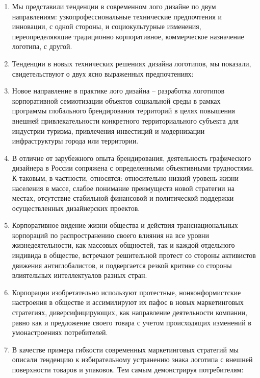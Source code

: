 \begin{enumerate}
\item Мы представили тенденции в современном лого дизайне по двум направлениям: узкопрофессиональные
  технические предпочтения и инновации, с одной стороны, и социокультурные изменения,
  переопределяющие традиционно корпоративное, коммерческое  назначение логотипа, с другой.
\item Тенденции в новых технических решениях дизайна логотипов, мы показали, свидетельствуют о двух
  ясно выраженных предпочтениях:
\item Новое направление в практике лого дизайна -- разработка логотипов корпоративной семиотизации
  объектов  социальной среды в рамках программы глобального брендирования территорий в целях
  повышения внешней привлекательности конкретного территориального субъекта для индустрии туризма,
  привлечения инвестиций и модернизации инфраструктуры города или территории.
\item В отличие от зарубежного опыта брендирования, деятельность графического дизайнера в России
  сопряжена с  определенными объективными трудностями. К таковым, в частности, относятся:
  относительно низкий уровень жизни населения в массе, слабое понимание преимуществ новой стратегии
  на местах, отсутствие стабильной финансовой и политической поддержки осуществленных дизайнерских
  проектов.
\item Корпоративное видение жизни общества и действия транснациональных корпораций по
  распространению своего влияния на все уровни жизнедеятельности, как массовых общностей, так и
  каждой отдельного индивида в обществе, встречают решительной протест со стороны активистов
  движения антиглобалистов, и подвергается резкой критике со стороны влиятельных интеллектуалов
  разных стран.
\item Корпорации изобретательно используют протестные, нонконформистские настроения в обществе и
  ассимилируют их пафос в новых маркетинговых стратегиях, диверсифицирующих, как направление
  деятельности компании, равно как и предложение своего товара с учетом происходящих изменений в
  умонастроениях потребителей.
\item В качестве примера гибкости современных маркетинговых стратегий мы описали тенденцию к
  избирательному устранению знака логотипа с внешней поверхности товаров и упаковок. Тем самым
  демонстрируя потребителям:
\end{enumerate}
